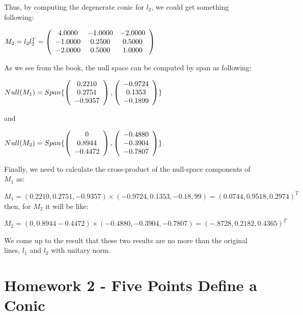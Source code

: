 \documentclass[]{article}
\begin{document}
Thus, by computing the degenerate conic for $l_{2}$, we could get something following:

\centerline {
$M_{2} = l_{2}l_{2}^T = 
\left( {\begin{array}{*{20}c}
	4.0000 & -1.0000 & -2.0000 \\
	-1.0000 & 0.2500 & 0.5000 \\
	-2.0000 &  0.5000 & 1.0000   
	\end{array} } \right)$
}

As we see from the book, the null space can be computed by span as following:

\centerline {
	$Null(M_{1}) = Span\{\left( {\begin{array}{*{20}c}
	0.2210 \\
	0.2751 \\
	-0.9357  
	\end{array} } \right),\left( {\begin{array}{*{20}c}
	-0.9724 \\
	 0.1353 \\
	-0.1899  
	\end{array} } \right) \}$ 
}

and 

\centerline { $Null(M_{2}) = Span\{\left( {\begin{array}{*{20}c}
	0 \\
	0.8944 \\
	-0.4472  
	\end{array} } \right),\left( {\begin{array}{*{20}c}
	-0.4880 \\
	-0.3904 \\
	-0.7807  
	\end{array} } \right) \}$ }

Finally, we need to calculate the cross-product of the null-space components of $M_{1}$ as:

$M_{1} = (0.2210, 0.2751, -0.9357) \times (-0.9724, 0.1353, -0.18,99) = (0.0744, 0.9518, 0.2974)^T$
\vspace{0.2em}
then, for $M_{2}$ it will be like:
\vspace{0.2em}

$M_{2} = (0, 0.8944 - 0.4472) \times (-0.4880, -0.3904, -0.7807) = (-.8728, 0.2182, 0.4365)^T$

We come up to the result that these two results are no more than the original lines, $l_{1}$ and $l_{2}$ with unitary norm.  

\section{Homework 2 - Five Points Define a Conic}
\end{document}
